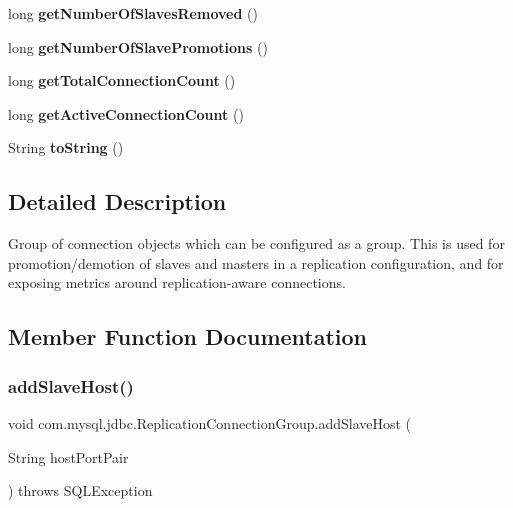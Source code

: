 \begin{DoxyCompactItemize}
long {\bfseries get\+Number\+Of\+Slaves\+Removed} ()
\item 
\mbox{\label{classcom_1_1mysql_1_1jdbc_1_1_replication_connection_group_ab1bc2e20b1c757711abcbf7a0557efd8}} 
long {\bfseries get\+Number\+Of\+Slave\+Promotions} ()
\item 
\mbox{\label{classcom_1_1mysql_1_1jdbc_1_1_replication_connection_group_abb15644d430b46060e59164c61eec53b}} 
long {\bfseries get\+Total\+Connection\+Count} ()
\item 
\mbox{\label{classcom_1_1mysql_1_1jdbc_1_1_replication_connection_group_a3fcafa79664d4bb7ba3edff7dd39c23d}} 
long {\bfseries get\+Active\+Connection\+Count} ()
\item 
\mbox{\label{classcom_1_1mysql_1_1jdbc_1_1_replication_connection_group_ae3173af084116d0b6c75c389868d2dd0}} 
String {\bfseries to\+String} ()
\end{DoxyCompactItemize}


\subsection{Detailed Description}
Group of connection objects which can be configured as a group. This is used for promotion/demotion of slaves and masters in a replication configuration, and for exposing metrics around replication-\/aware connections. 

\subsection{Member Function Documentation}
\mbox{\label{classcom_1_1mysql_1_1jdbc_1_1_replication_connection_group_a8e01912c5eb8fa7845a475ad9304ad1d}} 
\subsubsection{\texorpdfstring{add\+Slave\+Host()}{addSlaveHost()}}
{\footnotesize\ttfamily void com.\+mysql.\+jdbc.\+Replication\+Connection\+Group.\+add\+Slave\+Host (\begin{DoxyParamCaption}\item[{String}]{host\+Port\+Pair }\end{DoxyParamCaption}) throws S\+Q\+L\+Exception}

